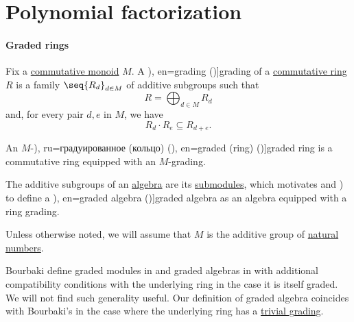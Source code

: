\section{Polynomial factorization}\label{sec:polynomial_factorization}

\paragraph{Graded rings}

\begin{definition}\label{def:graded_ring}
  Fix a \hyperref[def:monoid/commutative]{commutative monoid} \( M \). A \term[ru=градуировка (\cite[197]{Винберг2014КурсАлгебры}), en=grading (\cite[527]{Aluffi2009Algebra})]{grading} of a \hyperref[def:ring/commutative]{commutative ring} \( R \) is a family \( \seq{ R_d }_{d \in M} \) of additive subgroups such that
  \begin{equation*}
    R = \bigoplus_{d \in M} R_d
  \end{equation*}
  and, for every pair \( d, e \) in \( M \), we have
  \begin{equation}\label{eq:def:graded_ring}
    R_d \cdot R_e \subseteq R_{d + e}.
  \end{equation}

  An \( M \)-\term[bg=градуиран (пръстен) (\cite[56]{КоцевСидеров2016КомутативнаАлгебра}), ru=градуированное (кольцо) (\cite[63]{Шафаревич1999ОсновныеПонятияАлгебры}), en=graded (ring) (\cite[29]{Eisenbud1995CommutativeAlgebra})]{graded ring} is a commutative ring equipped with an \( M \)-grading.

  The additive subgroups of an \hyperref[def:algebra_over_ring]{algebra} are its \hyperref[def:module/submodel]{submodules}, which motivates  and ) to define a \term[ru=градуированная (алгебра) (\cite[197]{Винберг2014КурсАлгебры}), en=graded algebra (\cite[exerc. B-5.2]{Rotman2015AdvancedModernAlgebraPart1})]{graded algebra} as an algebra equipped with a ring grading.

  Unless otherwise noted, we will assume that \( M \) is the additive group of \hyperref[def:natural_numbers]{natural numbers}.
\end{definition}
\begin{comments}
  \item Bourbaki define graded modules in \cite[def. II.11.3]{Bourbaki1998Algebra1to3} and graded algebras in \cite[def. III.3.1]{Bourbaki1998Algebra1to3} with additional compatibility conditions with the underlying ring in the case it is itself graded. We will not find such generality useful. Our definition of graded algebra coincides with Bourbaki's in the case where the underlying ring has a \hyperref[def:trivial_ring_grading]{trivial grading}.
\end{comments}

